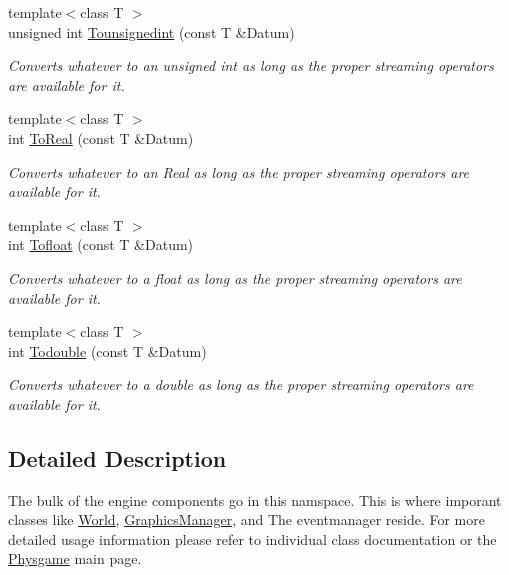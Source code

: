 \begin{DoxyCompactItemize}
{\footnotesize template$<$class T $>$ }\\unsigned int \hyperlink{namespacephys_a16ab66903d5e438a04f4e859c8aa47a7}{Tounsignedint} (const T \&Datum)
\begin{DoxyCompactList}\small\item\em Converts whatever to an unsigned int as long as the proper streaming operators are available for it. \item\end{DoxyCompactList}\item 
{\footnotesize template$<$class T $>$ }\\int \hyperlink{namespacephys_af9c39435b1181dab9b49b7c2aeb57127}{ToReal} (const T \&Datum)
\begin{DoxyCompactList}\small\item\em Converts whatever to an Real as long as the proper streaming operators are available for it. \item\end{DoxyCompactList}\item 
{\footnotesize template$<$class T $>$ }\\int \hyperlink{namespacephys_a306865e81b7e30cd45a166b4a173c4b4}{Tofloat} (const T \&Datum)
\begin{DoxyCompactList}\small\item\em Converts whatever to a float as long as the proper streaming operators are available for it. \item\end{DoxyCompactList}\item 
{\footnotesize template$<$class T $>$ }\\int \hyperlink{namespacephys_ad79753f6940f454a377a029570b0a3e0}{Todouble} (const T \&Datum)
\begin{DoxyCompactList}\small\item\em Converts whatever to a double as long as the proper streaming operators are available for it. \item\end{DoxyCompactList}\end{DoxyCompactItemize}


\subsection{Detailed Description}
The bulk of the engine components go in this namspace. This is where imporant classes like \hyperlink{classphys_1_1World}{World}, \hyperlink{classphys_1_1GraphicsManager}{GraphicsManager}, and The eventmanager reside. For more detailed usage information please refer to individual class documentation or the \hyperlink{index}{Physgame} main page. 

